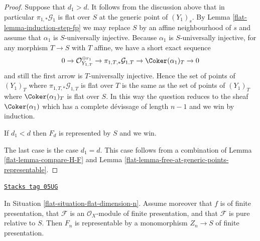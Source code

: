 \begin{proof}
\medskip\noindent
Suppose that $d_1 > d$. It follows from the discussion above that
in particular $\pi_{1, *}\mathcal{G}_1$ is flat over $S$ at
the generic point of $(Y_1)_s$. By
Lemma \ref{flat-lemma-induction-step-fp}
we may replace $S$ by an affine neighbourhood of $s$ and assume that
$\alpha_1$ is $S$-universally injective. Because $\alpha_1$ is
$S$-universally injective, for any morphism $T \to S$ with $T$ affine,
we have a short exact sequence
$$
0 \to \mathcal{O}_{Y_{1, T}}^{\oplus r_1}
\to \pi_{1, T, *}\mathcal{G}_{1, T} \to \Coker(\alpha_1)_T \to 0
$$
and still the first arrow is $T$-universally injective. Hence the set
of points of $(Y_1)_T$ where $\pi_{1, T, *}\mathcal{G}_{1, T}$ is flat over
$T$ is the same as the set of points of $(Y_1)_T$ where
$\Coker(\alpha_1)_T$ is flat over $S$. In this way the question
reduces to the sheaf $\Coker(\alpha_1)$ which has a complete
d\'evissage of length $n - 1$ and we win by induction.

\medskip\noindent
If $d_1 < d$ then $F_d$ is represented by $S$ and we win.

\medskip\noindent
The last case is the case $d_1 = d$. This case follows from a combination of
Lemma \ref{flat-lemma-compare-H-F}
and
Lemma \ref{flat-lemma-free-at-generic-points-representable}.
\end{proof}

\begin{theorem}
\label{flat-theorem-flat-dimension-n-representable}
\href{https://stacks.math.columbia.edu/tag/05UG}{\texttt{Stacks tag 05UG}}

In Situation \ref{flat-situation-flat-dimension-n}.
Assume moreover that $f$ is of finite presentation, that
$\mathcal{F}$ is an $\mathcal{O}_X$-module of finite presentation,
and that $\mathcal{F}$ is pure relative to $S$.
Then $F_n$ is representable by a monomorphism
$Z_n \to S$ of finite presentation.
\end{theorem}

